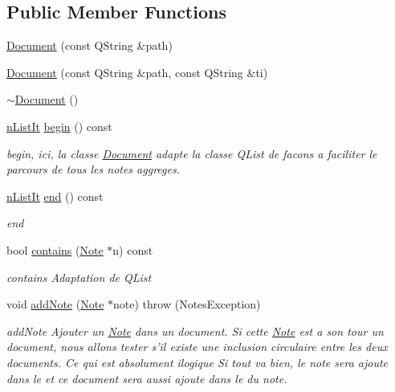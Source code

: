 \subsection*{Public Member Functions}
\begin{DoxyCompactItemize}
\item 
\hyperlink{class_document_aca6489c198906844e79a676d4b57593e}{Document} (const Q\-String \&path)
\item 
\hyperlink{class_document_af011590c9e6f4ddd10e2be0aeb3de38d}{Document} (const Q\-String \&path, const Q\-String \&ti)
\item 
\hyperlink{class_document_ac2e3f62307dc22baac21ddc10fa1609c}{$\sim$\-Document} ()
\item 
\hyperlink{_document_8h_adfa7415447032dfb0c19676b86692b8e}{n\-List\-It} \hyperlink{class_document_ac734299d4da026c3f3bd15b48204b3f1}{begin} () const 
\begin{DoxyCompactList}\small\item\em begin, ici, la classe \hyperlink{class_document}{Document} adapte la classe Q\-List de facons a faciliter le parcours de tous les notes aggreges. \end{DoxyCompactList}\item 
\hyperlink{_document_8h_adfa7415447032dfb0c19676b86692b8e}{n\-List\-It} \hyperlink{class_document_a1887309c787359b6c140c709cc2a6954}{end} () const 
\begin{DoxyCompactList}\small\item\em end \end{DoxyCompactList}\item 
bool \hyperlink{class_document_aa6483a6877f59f7235d84d3d40870809}{contains} (\hyperlink{class_note}{Note} $\ast$n) const 
\begin{DoxyCompactList}\small\item\em contains Adaptation de Q\-List \end{DoxyCompactList}\item 
void \hyperlink{class_document_a995087b3ef739c69ca93bfc6290627ed}{add\-Note} (\hyperlink{class_note}{Note} $\ast$note)  throw (\-Notes\-Exception)
\begin{DoxyCompactList}\small\item\em add\-Note Ajouter un \hyperlink{class_note}{Note} dans un document. Si cette \hyperlink{class_note}{Note} est a son tour un document, nous allons tester s'il existe une inclusion circulaire entre les deux documents. Ce qui est absolument ilogique Si tout va bien, le note sera ajoute dans le  et ce document sera aussi ajoute dans le  du note. \end{DoxyCompactList}\item 

\end{DoxyCompactItemize}
